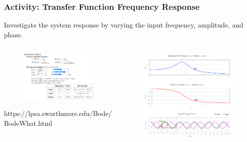 \documentclass[aspectratio=169]{beamer}
\begin{document}
\begin{frame}
	\frametitle{Activity: Transfer Function Frequency Response}
	Investigate the system response by varying the input frequency, amplitude, and phase.
	{\cite{swarthmore_bode}}
	\begin{columns}
		\begin{column}{0.5\textwidth}
			\begin{figure}
				\includegraphics[width=\textwidth]{Images/bode_demo_1.png}
			\end{figure}
			\footnotesize{https://lpsa.swarthmore.edu/Bode/BodeWhat.html}
		\end{column}
		\begin{column}{0.4\textwidth}
			\begin{figure}
				\includegraphics[width=\textwidth]{Images/bode_demo_2.png}
			\end{figure}
		\end{column}
	\end{columns}
\end{frame}
\end{document}
